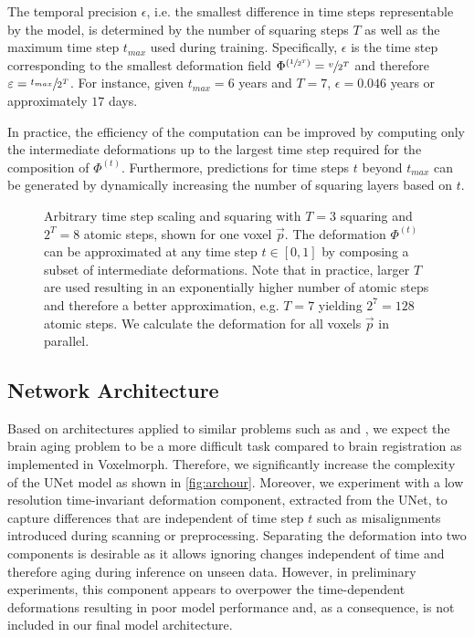 The temporal precision $\epsilon$, i.e. the smallest difference in time steps representable by the model, is determined by the number of squaring steps $T$ as well as the maximum time step $t_{max}$ used during training. Specifically, $\epsilon$ is the time step corresponding to the smallest deformation field $\Phi^{(\sfrac{1}{2^T})} = \sfrac{v}{2^T}$ and therefore $\varepsilon = \sfrac{t_{max}}{2^T}$. For instance, given $t_{max} = 6$ years and $T = 7$, $\epsilon = 0.046$ years or approximately $17$ days.

In practice, the efficiency of the computation can be improved by computing only the intermediate deformations up to the largest time step required for the composition of $\Phi^{(t)}$. Furthermore, predictions for time steps $t$ beyond $t_{max}$ can be generated by dynamically increasing the number of squaring layers based on $t$.



\begin{figure}
	\centering
	
	\caption{Arbitrary time step scaling and squaring with $T = 3$ squaring and $ 2^T = 8 $ atomic steps, shown for one voxel $ \vec p $. The deformation $ \Phi^{(t)} $ can be approximated at any time step $ t \in [0, 1] $ by composing a subset of intermediate deformations. Note that in practice, larger $T$ are used resulting in an exponentially higher number of atomic steps and therefore a better approximation, e.g. $T = 7$ yielding $ 2^7 = 128 $ atomic steps. We calculate the deformation for all voxels $ \vec{p} $ in parallel.} \label{fig:arbtimestep}
\end{figure}

\subsection{Network Architecture}
Based on architectures applied to similar problems such as \cite{wegmayr} and \cite{baumgartner2018visual}, we expect the brain aging problem to be a more difficult task compared to brain registration as implemented in Voxelmorph. Therefore, we significantly increase the complexity of the UNet model as shown in \autoref{fig:archour}.
Moreover, we experiment with a low resolution time-invariant deformation component, extracted from the UNet, to capture differences that are independent of time step $t$ such as misalignments introduced during scanning or preprocessing. Separating the deformation into two components is desirable as it allows ignoring changes independent of time and therefore aging during inference on unseen data.
However, in preliminary experiments, this component appears to overpower the time-dependent deformations resulting in poor model performance and, as a consequence, is not included in our final model architecture.

